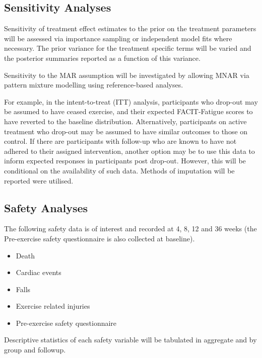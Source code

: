 \documentclass[11pt,parskip=half-]{scrartcl}
\providecommand{\tightlist}{%
  \setlength{\itemsep}{0pt}\setlength{\parskip}{0pt}}
\begin{document}
\subsection{Sensitivity Analyses}\label{sensitivity-analyses}

Sensitivity of treatment effect estimates to the prior on the treatment parameters will be assessed via importance sampling or independent model fits where necessary. The prior variance for the treatment specific terms will be varied and the posterior summaries reported as a function of this variance.

Sensitivity to the MAR assumption will be investigated by allowing MNAR via pattern mixture modelling using reference-based analyses.

For example, in the intent-to-treat (ITT) analysis, participants who drop-out may be assumed to have ceased exercise, and their expected FACIT-Fatigue scores to have reverted to the baseline distribution. Alternatively, participants on active treatment who drop-out may be assumed to have similar outcomes to those on control. If there are participants with follow-up who are known to have not adhered to their assigned intervention, another option may be to use this data to inform expected responses in participants post drop-out. However, this will be conditional on the availability of such data. Methods of imputation will be reported were utilised.

\subsection{Safety Analyses}\label{safety-analyses}

The following safety data is of interest and recorded at 4, 8, 12 and 36 weeks (the Pre-exercise safety questionnaire is also collected at baseline).

\begin{itemize}\tightlist
  \item Death
  \item Cardiac events
  \item Falls
  \item Exercise related injuries
  \item Pre-exercise safety questionnaire
\end{itemize}

Descriptive statistics of each safety variable will be tabulated in aggregate and by group and followup.

\clearpage
\end{document}
